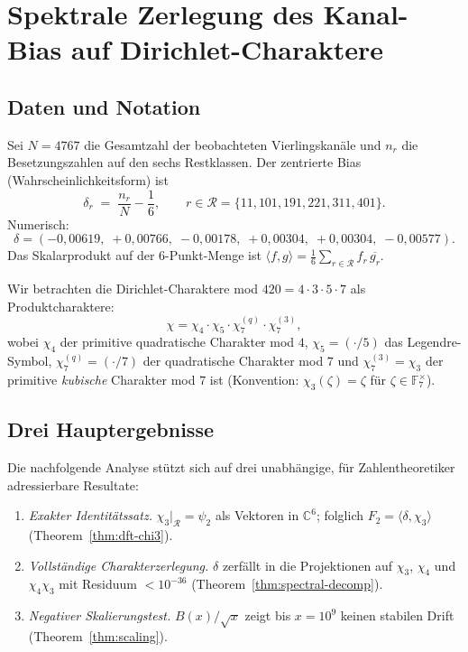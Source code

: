 
\section{Spektrale Zerlegung des Kanal-Bias auf Dirichlet-Charaktere}
\label{sec:spectral-decomposition}

\subsection{Daten und Notation}

Sei $N = 4767$ die Gesamtzahl der beobachteten Vierlingskanäle und
$n_r$ die Besetzungszahlen auf den sechs Restklassen.
Der zentrierte Bias (Wahrscheinlichkeitsform) ist
\[
  \delta_r \;=\; \frac{n_r}{N} - \frac{1}{6},
  \qquad r \in \mathcal{R} = \{11,101,191,221,311,401\}.
\]
Numerisch:
\[
  \delta = (-0{,}00619,\; +0{,}00766,\; -0{,}00178,\; +0{,}00304,\; +0{,}00304,\; -0{,}00577).
\]
Das Skalarprodukt auf der $6$-Punkt-Menge ist
$\langle f,g\rangle = \frac{1}{6}\sum_{r\in\mathcal{R}} f_r\,\overline{g_r}$.

Wir betrachten die Dirichlet-Charaktere mod $420 = 4\cdot 3\cdot 5\cdot 7$
als Produktcharaktere:
\[
  \chi = \chi_4 \cdot \chi_5 \cdot \chi_7^{(q)} \cdot \chi_7^{(3)},
\]
wobei $\chi_4$ der primitive quadratische Charakter mod $4$,
$\chi_5 = (\cdot/5)$ das Legendre-Symbol,
$\chi_7^{(q)} = (\cdot/7)$ der quadratische Charakter mod $7$ und
$\chi_7^{(3)} = \chi_3$ der primitive \emph{kubische} Charakter mod $7$ ist
(Konvention: $\chi_3(\zeta) = \zeta$ für $\zeta \in \mathbb{F}_7^\times$).

\subsection{Drei Hauptergebnisse}

Die nachfolgende Analyse stützt sich auf drei unabhängige, für
Zahlentheoretiker adressierbare Resultate:

\begin{enumerate}
  \item[\textbf{Satz A.}]
        \emph{Exakter Identitätssatz.}
        $\chi_3|_{\mathcal{R}} = \psi_2$ als Vektoren in $\mathbb{C}^6$;
        folglich $F_2 = \langle\delta,\chi_3\rangle$ (Theorem~\ref{thm:dft-chi3}).
  \item[\textbf{Satz B.}]
        \emph{Vollständige Charakterzerlegung.}
        $\delta$ zerfällt in die Projektionen auf $\chi_3$, $\chi_4$ und
        $\chi_4\chi_3$ mit Residuum $<10^{-36}$
        (Theorem~\ref{thm:spectral-decomp}).
  \item[\textbf{Satz C.}]
        \emph{Negativer Skalierungstest.}
        $B(x)/\sqrt{x}$ zeigt bis $x=10^9$ keinen stabilen Drift
        (Theorem~\ref{thm:scaling}).
\end{enumerate}

